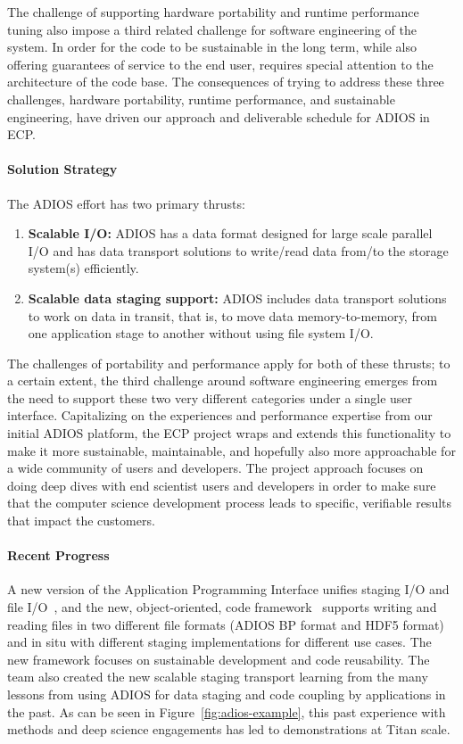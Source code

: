 The challenge of supporting hardware portability and runtime performance tuning also impose a third related challenge for software engineering of the system.  In order for the code to be sustainable in the long term, while also offering guarantees of service to the end user, requires special attention to the architecture of the code base.  The consequences of trying to address these three challenges, hardware portability, runtime performance, and sustainable engineering, have driven our approach and deliverable schedule for ADIOS in ECP.

\paragraph{Solution Strategy}

The ADIOS effort has two primary thrusts:
\begin{enumerate}
	\item \textbf{Scalable I/O:} ADIOS has a data format designed for large scale parallel I/O and has data transport solutions to write/read data from/to the storage system(s) efficiently.
	\item \textbf{Scalable data staging support:}  ADIOS includes data transport solutions to work on data in transit, that is, to move data memory-to-memory, from one application stage to another without using file system I/O.
\end{enumerate}

The challenges of portability and performance apply for both of these thrusts; to a certain extent, the third challenge around software engineering emerges from the need to support these two very different categories under a single user interface.  Capitalizing on the experiences and performance expertise from our initial ADIOS platform, the ECP project wraps and extends this functionality to make it more sustainable, maintainable, and hopefully also more approachable for a wide community of users and developers.  The project approach focuses on doing deep dives with end scientist users and developers in order to make sure that the computer science development process leads to specific, verifiable results that impact the customers.


\paragraph{Recent Progress}

A new version of the Application Programming Interface unifies staging I/O and file I/O~\cite{ADIOS2-docs}, and the new, object-oriented, code framework~\cite{ADIOS2-git} supports  writing and reading files in two different file formats (ADIOS BP format and HDF5 format) and in situ with different staging implementations for different use cases. The new framework focuses on sustainable development and code reusability. The team also created the new scalable staging transport learning from the many lessons from using ADIOS for data staging and code coupling by applications in the past. As can be seen in Figure~\ref{fig:adios-example}, this past experience with methods and deep science engagements has led to demonstrations at Titan scale.

